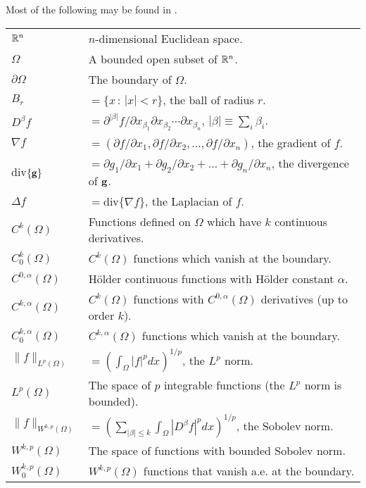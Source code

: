 \begin{normalsize}
    \renewcommand{\arraystretch}{1.655} 
Most of the following may be found in \cite{gilbarg:epd83}.\\ 
\begin{tabular}{ll} 
${\Bbb R}^n$ & $n$-dimensional Euclidean space. \\ 
$\Omega$ & A bounded open subset of ${\Bbb R}^n$. \\
$\partial\Omega$ & The boundary of $\Omega$. \\ 
$B_r$ & $=\{ x\, : \, |x|<r\}$, the ball of radius $r$.\\ 
$D^{\beta}f$ & $=\partial^{|\beta |}f/\partial x_{\beta_1}\partial
x_{\beta_2} \cdots \partial x_{\beta_n}$, $|\beta | \equiv \sum_i
\beta_i$. \\
$\nabla f$ & $=(\partial f/\partial x_1,\partial f/\partial x_2,\dots ,
\partial f/\partial x_n)$, the gradient of $f$. \\
div$\{ \bf g \}$ & $=\partial g_1/\partial x_1 + \partial g_2/\partial x_2
+ \dots + \partial g_n/\partial x_n$, the divergence of $\bf g$. \\
$\Delta f$ & $=\mbox{div}\{\nabla f\}$, the Laplacian of $f$. \\
$C^k(\Omega )$ & Functions defined
on $\Omega$ which have $k$ continuous derivatives. \\ 
$C^k_0(\Omega )$
& $C^k(\Omega )$ functions which vanish at the boundary. \\
$C^{0,\alpha}(\Omega )$ & H\"{o}lder continuous functions with
H\"{o}lder constant $\alpha$. \\ 
$C^{k,\alpha}(\Omega )$ & $C^k(\Omega
)$ functions with $C^{0,\alpha}(\Omega )$ derivatives (up to order
$k$). \\ 
$C^{k,\alpha}_0(\Omega )$ & $C^{k,\alpha}(\Omega )$ functions
which vanish at the boundary. \\ 
$\| f\|_{L^p(\Omega )}$ & $= \left(
\int_{\Omega}|f|^p dx \right)^{1/p}$, the $L^p$ norm.  \\
$L^p(\Omega )$ & The space of $p$ integrable functions (the $L^p$ norm
is bounded). \\ $\| f \|_{W^{k,p}(\Omega )}$ & $= \left( \sum_{|\beta |
\leq k} \int_{\Omega}|D^{\beta} f|^p dx \right)^{1/p}$, the Sobolev norm. \\
$W^{k,p}(\Omega )$ & The space of functions with bounded Sobolev norm.
\\ $W^{k,p}_0(\Omega )$ & $W^{k,p}(\Omega )$ functions that vanish a.e.
at the boundary.  
\end{tabular} 
\end{normalsize}
